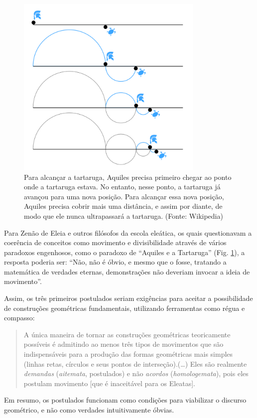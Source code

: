 \documentclass{hipatia}
\begin{document}
\begin{figure}[htb!]
\begin{center}
\includegraphics[width=9cm]{Aquiles.png}
\end{center}
\caption{\label{fig:Aquiles}
Para alcançar a tartaruga, Aquiles precisa primeiro 
chegar ao ponto onde a tartaruga estava. 
No entanto, nesse ponto, a tartaruga já avançou 
para uma nova posição. 
Para alcançar essa nova posição, Aquiles precisa 
cobrir mais uma distância, e assim por diante,
de modo que ele nunca ultrapassará a tartaruga.
(Fonte: Wikipedia)}   
\end{figure}

Para Zenão de Eleia e outros filósofos
da escola eleática, os quais questionavam a coerência
de conceitos como movimento e divisibilidade
através de vários paradoxos engenhosos, como
o paradoxo de ``Aquiles e a Tartaruga'' (Fig. \ref{fig:Aquiles}),
a resposta poderia ser: ``Não, não é óbvio, 
e mesmo que o fosse, tratando a matemática de
verdades eternas, demonstrações não deveriam
invocar a ideia de movimento''. 

Assim, os três primeiros postulados seriam
exigências para aceitar a possibilidade de construções
geométricas fundamentais, utilizando ferramentas como régua
e compasso:
\begin{quote}
	A única maneira de tornar as construções 
	geométricas teoricamente possíveis
	é admitindo ao menos três tipos de movimentos
	que são indispensáveis para a produção das
	formas geométricas mais simples (linhas retas,
	círculos e seus pontos de interseção).(\dots)
	Eles são realmente \emph{demandas} (\emph{aitemata},
	 postulados) e não \emph{acordos} (\emph{homologemata}),
	 pois eles postulam movimento [que é inaceitável
	 para os Eleatas].\cite{szabo1978}	
\end{quote}
Em resumo, os postulados funcionam como
condições para viabilizar o discurso geométrico,
e não como verdades intuitivamente óbvias.
\end{document}
